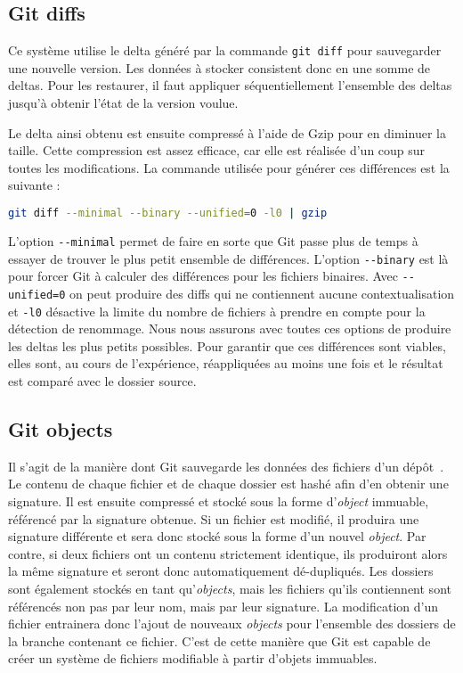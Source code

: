 \documentclass[a4paper]{report}
\begin{document}
\subsection{Git diffs}
\label{sec:git-diffs}

Ce système utilise le delta généré par la commande \verb|git diff|
pour sauvegarder une nouvelle version. Les données à stocker consistent
donc en une somme de deltas. Pour les restaurer, il faut
appliquer séquentiellement l'ensemble des deltas jusqu'à obtenir l'état
de la version voulue.

Le delta ainsi obtenu est ensuite compressé à l'aide de Gzip pour en diminuer la taille.
Cette compression est assez efficace, car elle est réalisée d'un coup sur toutes les modifications.
La commande utilisée pour générer ces différences est la suivante :

\begin{lstlisting}[language=sh]
git diff --minimal --binary --unified=0 -l0 | gzip
\end{lstlisting}

L'option \verb|--minimal| permet de faire en sorte que Git passe plus de temps
à essayer de trouver le plus petit ensemble de différences.
L'option \verb|--binary| est là pour forcer Git
à calculer des différences pour les fichiers binaires.
Avec \verb|--unified=0| on peut produire des diffs
qui ne contiennent aucune contextualisation
et \verb|-l0| désactive la limite du nombre de fichiers
à prendre en compte pour la détection de renommage.
Nous nous assurons avec toutes ces options de produire les deltas les plus petits possibles.
Pour garantir que ces différences sont viables,
elles sont, au cours de l'expérience, réappliquées au moins une fois
et le résultat est comparé avec le dossier source.

\subsection{Git objects}

Il s'agit de la manière dont Git
sauvegarde les données des fichiers d'un dépôt~\cite{straub2006git}. Le contenu de chaque
fichier et de chaque dossier est hashé afin d'en obtenir une signature.
Il est ensuite compressé et stocké sous la forme d'\emph{object}
immuable, référencé par la signature obtenue. Si un fichier est modifié,
il produira une signature différente et sera donc stocké sous la forme
d'un nouvel \emph{object}. Par contre, si deux fichiers ont un contenu
strictement identique, ils produiront alors la même signature et seront
donc automatiquement dé-dupliqués. Les dossiers sont également stockés
en tant qu'\emph{objects}, mais les fichiers qu'ils contiennent sont
référencés non pas par leur nom, mais par leur signature. La
modification d'un fichier entrainera donc l'ajout de nouveaux
\emph{objects} pour l'ensemble des dossiers de la branche contenant ce
fichier. C'est de cette manière que Git est capable de créer un système
de fichiers modifiable à partir d'objets immuables.
\end{document}
